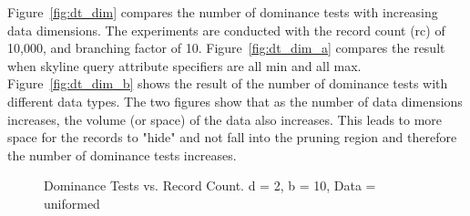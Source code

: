 Figure~\ref{fig:dt_dim} compares the number of dominance tests with
increasing data dimensions. The experiments are conducted with the
record count (rc) of 10,000, and branching factor of 10.
Figure~\ref{fig:dt_dim_a} compares the result when skyline query
attribute specifiers are all min and all max.
Figure~\ref{fig:dt_dim_b} shows the result of the number of dominance
tests with different data types.
The two figures show that as the number of data dimensions increases,
the volume (or space) of the data also increases. This leads to more
space for the records to "hide" and not fall into the pruning region
and therefore the number of dominance tests increases.

\begin{figure}
  \centering
  \caption{\small Dominance Tests vs. Record Count. d = 2, b = 10,
  Data = uniformed}
  \label{fig:dt_rc}
\end{figure}


